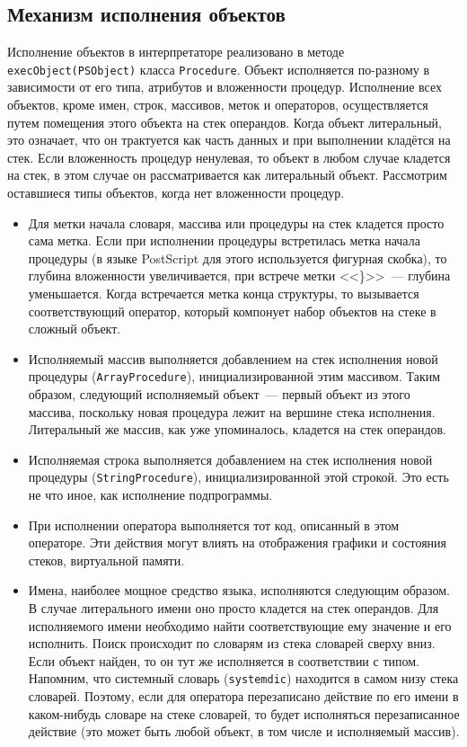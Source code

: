 \documentclass[14pt]{extarticle}
\begin{document}
\subsection{Механизм исполнения объектов}
Исполнение объектов в интерпретаторе реализовано в методе  \texttt{execObject(PSObject)} класса \texttt{Procedure}. Объект исполняется по-разному в зависимости от его типа, атрибутов и вложенности процедур. Исполнение всех объектов, кроме имен, строк, массивов, меток и операторов, осуществляется путем помещения этого объекта на стек операндов. Когда объект литеральный, это означает, что он трактуется как часть данных и при выполнении кладётся на стек. Если вложенность процедур ненулевая, то объект в любом случае кладется на стек, в этом случае он рассматривается как литеральный объект. Рассмотрим оставшиеся типы объектов, когда нет вложенности процедур.
\begin{itemize}
\item  Для метки начала словаря, массива или процедуры на стек кладется просто сама метка.
Если при исполнении процедуры встретилась метка начала процедуры (в языке PostScript для этого используется фигурная скобка), то глубина вложенности увеличивается, при встрече метки <<\}>>~--- глубина уменьшается. Когда встречается метка конца структуры, то вызывается соответствующий оператор, который компонует набор объектов на стеке в сложный объект.

\item Исполняемый массив выполняется добавлением на стек исполнения новой процедуры (\texttt{ArrayProcedure}), инициализированной этим массивом. Таким образом, следующий исполняемый объект~--- первый объект из этого массива, поскольку новая процедура лежит на вершине стека исполнения. Литеральный же массив, как уже упоминалось, кладется на стек операндов.

\item Исполняемая строка выполняется добавлением на стек исполнения новой процедуры (\texttt{StringProcedure}), инициализированной этой строкой. Это есть не что иное, как исполнение подпрограммы.

\item При исполнении оператора выполняется тот код, описанный в этом операторе. Эти действия могут  влиять на отображения графики и состояния стеков, виртуальной памяти.

\item Имена, наиболее мощное средство языка, исполняются следующим образом. В случае литерального имени оно просто кладется на стек операндов. Для исполняемого имени необходимо найти соответствующие ему значение и его исполнить. Поиск происходит по словарям из стека словарей сверху вниз. Если объект найден, то он тут же исполняется в соответствии с типом. Напомним, что системный словарь (\texttt{systemdic}) находится в самом низу стека словарей. Поэтому, если для  оператора перезаписано действие по его имени в каком-нибудь словаре на стеке словарей, то будет исполняться перезаписанное действие (это может быть любой объект, в том числе и исполняемый массив).
\end{itemize}
\end{document}
